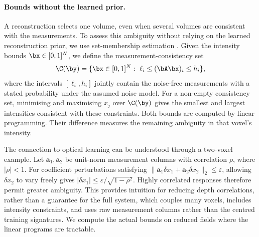 \paragraph{Bounds without the learned prior.} A reconstruction selects one volume, even when several volumes are consistent with the measurements. To assess this ambiguity without relying on the learned reconstruction prior, we use set-membership estimation \cite{milanese1991,haldar2023}. Given the intensity bounds $\bx\in[0,1]^N$, we define the measurement-consistency set
\begin{equation*}
\C(\by)=\{\bx\in[0,1]^N:\ \ell_i\le(\bA\bx)_i\le h_i\},
\end{equation*}
where the intervals $[\ell_i,h_i]$ jointly contain the noise-free measurements with a stated probability under the assumed noise model. For a non-empty consistency set, minimising and maximising $x_j$ over $\C(\by)$ gives the smallest and largest intensities consistent with these constraints. Both bounds are computed by linear programming. Their difference measures the remaining ambiguity in that voxel's intensity.

The connection to optical learning can be understood through a two-voxel example. Let $\mathbf a_1,\mathbf a_2$ be unit-norm measurement columns with correlation $\rho$, where $|\rho|<1$. For coefficient perturbations satisfying $\|\mathbf a_1\delta x_1+\mathbf a_2\delta x_2\|_2\le\varepsilon$, allowing $\delta x_2$ to vary freely gives $|\delta x_1|\le\varepsilon/\sqrt{1-\rho^2}$. Highly correlated responses therefore permit greater ambiguity. This provides intuition for reducing depth correlations, rather than a guarantee for the full system, which couples many voxels, includes intensity constraints, and uses raw measurement columns rather than the centred training signatures. We compute the actual bounds on reduced fields where the linear programs are tractable.
